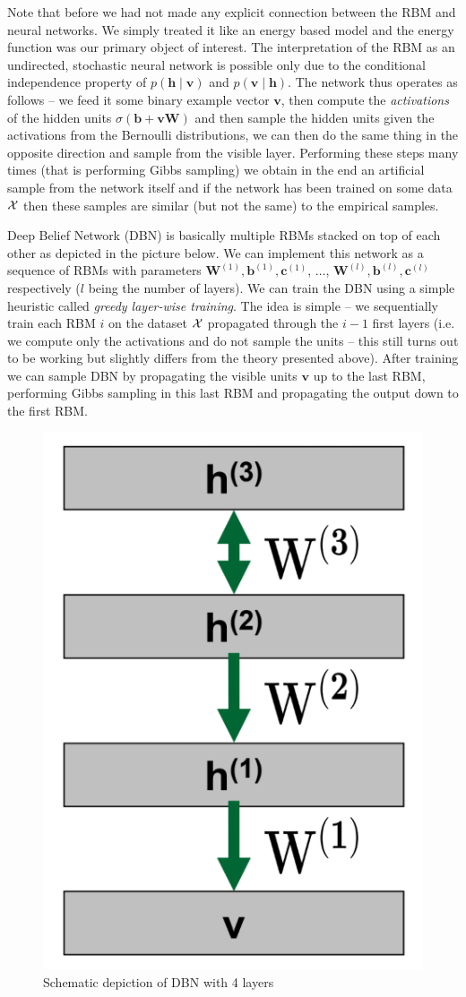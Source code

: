 \documentclass{myclass}
\begin{document}
Note that before we had not made any explicit connection between the RBM and neural networks. We
simply treated it like an energy based model and the energy function was our primary object of
interest. The interpretation of the RBM as an undirected, stochastic neural network is possible only
due to the conditional independence property of $p(\bm{h} \mid \bm{v})$ and $p(\bm{v} \mid \bm{h})$.
The network thus operates as follows -- we feed it some binary example vector $\bm{v}$, then compute
the \emph{activations} of the hidden units $\sigma(\bm{b} + \bm{v}\bm{W})$ and then sample the
hidden units given the activations from the Bernoulli distributions, we can then do the same thing
in the opposite direction and sample from the visible layer. Performing these steps many times (that
is performing Gibbs sampling) we obtain in the end an artificial sample from the network itself and
if the network has been trained on some data $\mathcal{X}$ then these samples are similar (but not the
same) to the empirical samples.

Deep Belief Network (DBN) is basically multiple RBMs stacked on top of each other as depicted in the
picture below. We can implement this network as a sequence of RBMs with parameters $\bm{W}^{(1)},
\bm{b}^{(1)}, \bm{c}^{(1)}$, $\ldots$, $\bm{W}^{(l)}, \bm{b}^{(l)}, \bm{c}^{(l)}$ respectively ($l$
being the number of layers). We can train the DBN using a simple heuristic called \emph{greedy
layer-wise training}. The idea is simple -- we sequentially train each RBM $i$ on the dataset
$\mathcal{X}$ propagated through the $i-1$ first layers (i.e. we compute only the activations and do not
sample the units -- this still turns out to be working but slightly differs from the theory
presented above). After training we can sample DBN by propagating the visible units $\bm{v}$ up to
the last RBM, performing Gibbs sampling in this last RBM and propagating the output down to the
first RBM.

\begin{figure}[ht]
   \centering
   \includegraphics[width=0.45\columnwidth]{figs/dbn.png}
   \caption{Schematic depiction of DBN with 4 layers}
   \label{fig:dbn}
\end{figure}
\end{document}

